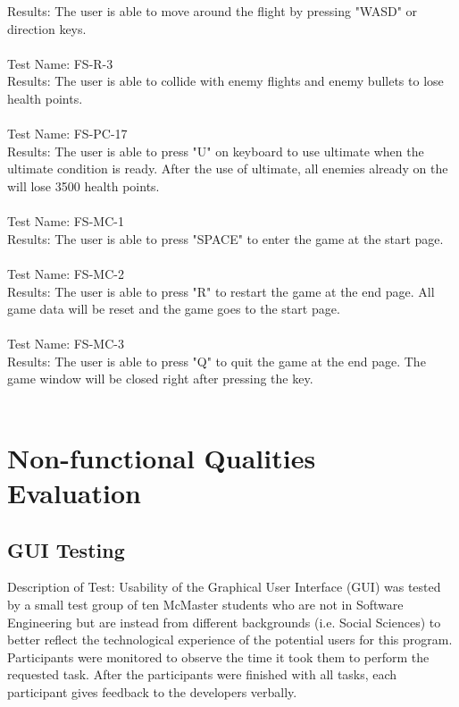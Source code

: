 \documentclass[12,english]{article}
\begin{document}
	Results: The user is able to move around the flight by pressing "WASD" or direction keys. \\ \\
	
	Test Name: FS-R-3 \\
	
	Results: The user is able to collide with enemy flights and enemy bullets to lose health points. \\ \\
	
	Test Name: FS-PC-17 \\
	
	Results: The user is able to press "U" on keyboard to use ultimate when the ultimate condition is ready. After the use of ultimate, all enemies already on the will lose 3500 health points.\\ \\
	
	Test Name: FS-MC-1 \\
	
	Results: The user is able to press "SPACE" to enter the game at the start page. \\ \\
	
	Test Name: FS-MC-2 \\
	
	Results: The user is able to press "R" to restart the game at the end page. All game data will be reset and the game goes to the start page.\\ \\
	
	Test Name: FS-MC-3 \\
	
	Results: The user is able to press "Q" to quit the game at the end page. The game window will be closed right after pressing the key.\\ \\
	

\section{Non-functional Qualities Evaluation} 	\subsection{GUI Testing}
Description of Test: Usability of the Graphical User Interface (GUI) was tested by a small test group of ten McMaster students who are not in Software Engineering but are instead from different backgrounds (i.e.  Social Sciences) to better reflect the technological experience of the potential users for this program. Participants were monitored to observe the time it took them to perform the requested task. After the participants were finished with all tasks, each participant gives feedback to the developers verbally.
\end{document}
